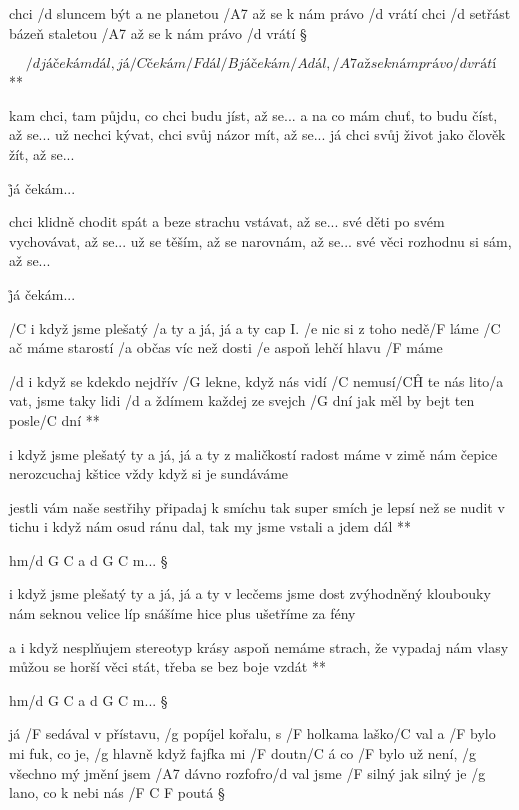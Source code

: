 
chci /d sluncem být a ne planetou
/A7 až se k nám právo /d vrátí
chci /d setřást bázeň staletou
/A7 až se k nám právo /d vrátí \S

\R \[ /d já čekám dál, já /C čekám /F dál
   /B já čekám /A dál, /A7 až se k nám právo /d vrátí \]**

kam chci, tam půjdu, co chci budu jíst, až se...
a na co mám chuť, to budu číst, až se...
už nechci kývat, chci svůj názor mít, až se...
já chci svůj život jako člověk žít, až se... \s

\r já čekám...

chci klidně chodit spát a beze strachu vstávat, až se...
své děti po svém vychovávat, až se...
už se těším, až se narovnám, až se...
své věci rozhodnu si sám, až se... \s

\r já čekám...




/C i když jsme plešatý /a ty a já, já a ty \hfill cap I.
/e nic si z toho nedě/F láme
/C ač máme starostí /a občas víc než dosti
/e aspoň lehčí hlavu /F máme

\R  /d i když se kdekdo nejdřív /G lekne, když nás vidí
    /C nemusí/C\^H te nás lito/a vat, jsme taky lidi
    /d a ždímem každej ze svejch /G dní
    jak měl by bejt ten posle/C dní **

i když jsme plešatý ty a já, já a ty
z maličkostí radost máme
v zimě nám čepice nerozcuchaj kštice
vždy když si je sundáváme

\R  jestli vám naše sestřihy připadaj k smíchu
    tak super smích je lepsí než se nudit v tichu
    i když nám osud ránu dal,
    tak my jsme vstali a jdem dál **

hm/{d G C a d G C} m... \S

i když jsme plešatý ty a já, já a ty
v lecčems jsme dost zvýhodněný
kloubouky nám seknou velice líp snášíme hice
plus ušetříme za fény

\R  a i když nesplňujem stereotyp krásy
    aspoň nemáme strach, že vypadaj nám vlasy
    můžou se horší věci stát,
    třeba se bez boje vzdát **

hm/{d G C a d G C} m... \S





já /F sedával v přístavu, /g popíjel kořalu, s /F holkama laško/C val
a /F bylo mi fuk, co je, /g hlavně když fajfka mi /F doutn/C á
co /F bylo už není, /g všechno mý jmění jsem /A7 dávno rozfofro/d val
jsme /F silný jak silný je /g lano, co k nebi nás /{F C F} poutá \S

